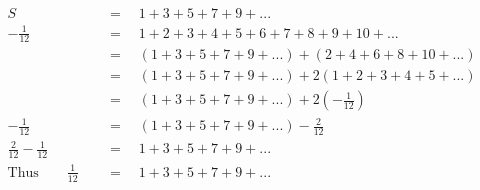 \begin{align*}
S\quad&\,=\quad1+3+5+7+9+...\\
-\frac{1}{12}\quad&\,=\quad1+2+3+4+5+6+7+8+9+10+...\\
\,&\,=\quad(1+3+5+7+9+...)+(2+4+6+8+10+...)\\
\,&\,=\quad(1+3+5+7+9+...)+2(1+2+3+4+5+...)\\
\,&\,=\quad(1+3+5+7+9+...)+2\left(-\frac{1}{12}\right)\\
-\frac{1}{12}\quad&\,=\quad(1+3+5+7+9+...)-\frac{2}{12}\\
\frac{2}{12}-\frac{1}{12}\quad&\,=\quad1+3+5+7+9+...\\
\mathrm{Thus}\qquad\frac{1}{12}\quad&\,=\quad1+3+5+7+9+...
\end{align*}
